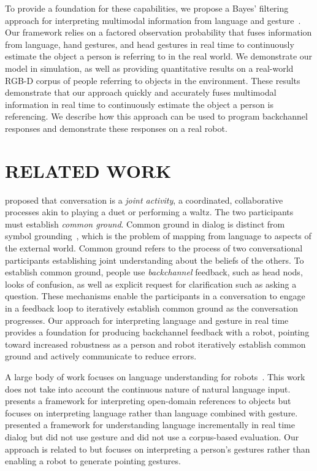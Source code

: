 \documentclass[letterpaper, 10 pt, conference]{ieeeconf}
\begin{document}
To provide a foundation for these capabilities, we propose a Bayes'
filtering approach for interpreting multimodal information from
language and gesture~\citep{thrun08}.  Our framework relies on a
factored observation probability that fuses information from language,
hand gestures, and head gestures in real time to continuously estimate
the object a person is referring to in the real world.  We demonstrate
our model in simulation, as well as providing quantitative results on
a real-world RGB-D corpus of people referring to objects in the
environment.  These results demonstrate that our approach quickly and
accurately fuses multimodal information in real time to continuously
estimate the object a person is referencing.  We describe how this
approach can be used to program backchannel responses and demonstrate
these responses on a real robot.


\section{RELATED WORK}

\citet{clark96} proposed that conversation is a {\em joint activity},
a coordinated, collaborative processes akin to playing a duet or
performing a waltz.  The two participants must establish {\em common
  ground}.  Common ground in dialog is distinct from symbol
grounding~\citep{harnad90}, which is the problem of mapping from
language to aspects of the external world.  Common ground refers to
the process of two conversational participants establishing joint
understanding about the beliefs of the others.  To establish common
ground, people use {\em backchannel} feedback, such as head nods,
looks of confusion, as well as explicit request for clarification such
as asking a question.  These mechanisms enable the participants in a
conversation to engage in a feedback loop to iteratively establish
common ground as the conversation progresses.  Our approach for
interpreting language and gesture in real time provides a foundation
for producing backchannel feedback with a robot, pointing toward
increased robustness as a person and robot iteratively establish
common ground and actively communicate to reduce errors.

A large body of work focuses on language understanding for
robots~\citep{macmahon06, dzifcak09, kollar10, matuszek12}.  This work
does not take into account the continuous nature of natural language
input.  \citet{guadarrama14} presents a framework for interpreting
open-domain references to objects but focuses on interpreting language
rather than language combined with gesture.  \citet{cantrell10}
presented a framework for understanding language incrementally in real
time dialog but did not use gesture and did not use a corpus-based
evaluation.  Our approach is related to \citet{holladay14} but focuses
on interpreting a person's gestures rather than enabling a robot to
generate pointing gestures.
\end{document}
